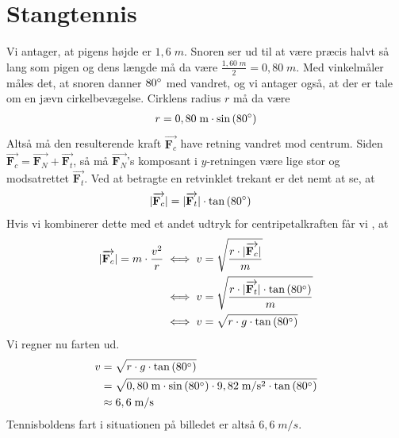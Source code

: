 \documentclass{report}
\begin{document}
\section*{Stangtennis}
Vi antager, at pigens højde er $1,6 \;\unit{m} $.
Snoren ser ud til at være præcis halvt så lang som pigen og dens længde må da være $\frac{1,60 \;\unit{m} }{2}=0,80 \;\unit{m} $.
Med vinkelmåler måles det, at snoren danner $80 \degree$ med vandret, og vi antager også, at der er tale om en jævn cirkelbevægelse.
Cirklens radius $r$ må da være
\begin{equation*}
\begin{split}
  r=0,80 \;\unit{m} \cdot \sin\left(80 \degree  \right)
\end{split}
\end{equation*}
Altså må den resulterende kraft $\overrightarrow{\textbf{F}_c} $ have retning vandret mod centrum. 
Siden $\overrightarrow{\textbf{F}_c} = \overrightarrow{\textbf{F}_N}+\overrightarrow{\textbf{F}_t} $, så må $\overrightarrow{\textbf{F}_N}$'s komposant i $y$-retningen være lige stor og modsatrettet $\overrightarrow{\textbf{F}_t}$. 
Ved at betragte en retvinklet trekant er det nemt at se, at
\begin{equation*}
\begin{split}
  |\overrightarrow{\textbf{F}_c}|&=|\overrightarrow{\textbf{F}_t}| \cdot \tan\left(80 \degree \right) 
\end{split}
\end{equation*}
Hvis vi kombinerer dette med et andet udtryk for centripetalkraften får vi , at
\begin{equation*}
\begin{split}
  |\overrightarrow{\textbf{F}_c}|=m \cdot \frac{v^2}{r} &\iff v=\sqrt{\frac{r \cdot|\overrightarrow{\textbf{F}_c}|}{m}} \\
  &\iff v=\sqrt{\frac{r \cdot|\overrightarrow{\textbf{F}_t}| \cdot \tan\left(80 \degree \right)  }{m}} \\
  &\iff v=\sqrt{r \cdot g \cdot \tan\left(80 \degree \right)  } \\
\end{split}
\end{equation*}
Vi regner nu farten ud.
\begin{equation*}
\begin{split}
  v&=\sqrt{r \cdot g \cdot \tan\left(80 \degree \right)  } \\
  &=\sqrt{0,80 \;\unit{m} \cdot \sin\left(80 \degree \right) \cdot 9,82 \;\unit{m/s^2} \cdot \tan\left(80 \degree \right)  } \\
  &\approx 6,6 \;\unit{m/s} 
\end{split}
\end{equation*}
Tennisboldens fart i situationen på billedet er altså $6,6 \;\unit{m/s} $.
\end{document}
